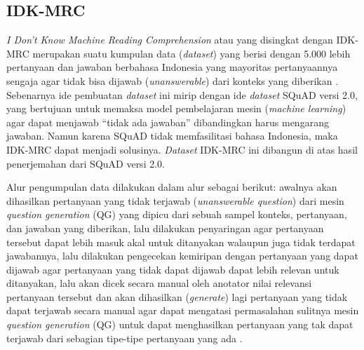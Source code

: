 \subsection{IDK-MRC}
\emph{I Don’t Know Machine Reading Comprehension} atau yang disingkat dengan IDK-MRC merupakan suatu kumpulan data (\emph{dataset}) yang berisi dengan 5.000 lebih pertanyaan dan jawaban berbahasa Indonesia yang mayoritas pertanyaannya sengaja agar tidak bisa dijawab (\emph{unanswerable}) dari konteks yang diberikan \citep{putri-oh-2022-idk}. Sebenarnya ide pembuatan \emph{dataset} ini mirip dengan ide \emph{dataset} SQuAD versi 2.0, yang bertujuan untuk memaksa model pembelajaran mesin (\emph{machine learning}) agar dapat menjawab “tidak ada jawaban” dibandingkan harus mengarang jawaban. Namun karena SQuAD tidak memfasilitasi bahasa Indonesia, maka IDK-MRC dapat menjadi solusinya. \emph{Dataset} IDK-MRC ini dibangun di atas hasil penerjemahan dari SQuAD versi 2.0.

Alur pengumpulan data dilakukan dalam alur sebagai berikut: awalnya akan dihasilkan pertanyaan yang tidak terjawab (\emph{unanswerable question}) dari mesin \emph{question generation} (QG) yang dipicu dari sebuah sampel konteks, pertanyaan, dan jawaban yang diberikan, lalu dilakukan penyaringan agar pertanyaan tersebut dapat lebih masuk akal untuk ditanyakan walaupun juga tidak terdapat jawabannya, lalu dilakukan pengecekan kemiripan dengan pertanyaan yang dapat dijawab agar pertanyaan yang tidak dapat dijawab dapat lebih relevan untuk ditanyakan, lalu akan dicek secara manual oleh anotator nilai relevansi pertanyaan tersebut dan akan dihasilkan (\emph{generate}) lagi pertanyaan yang tidak dapat terjawab secara manual agar dapat mengatasi permasalahan sulitnya mesin \emph{question generation} (QG) untuk dapat menghasilkan pertanyaan yang tak dapat terjawab dari sebagian tipe-tipe pertanyaan yang ada \citep{putri-oh-2022-idk}.

